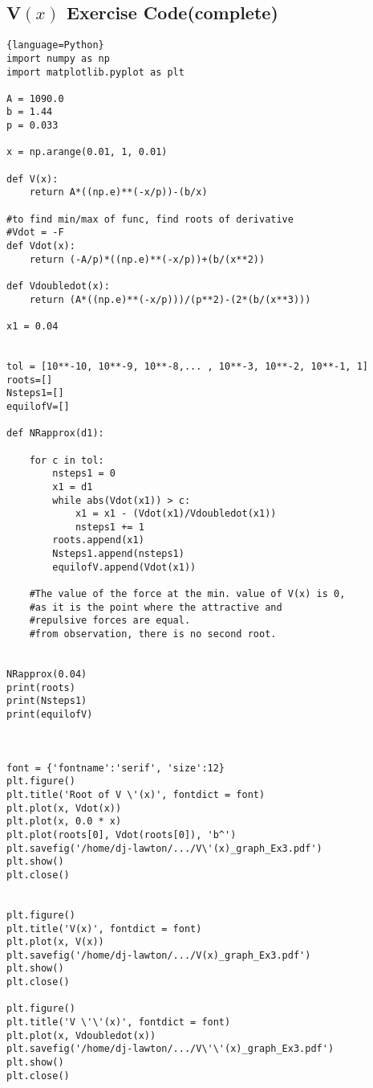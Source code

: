 \documentclass{article}
\begin{document}
\subsection{V$(x)$ Exercise Code(complete)}
\begin{lstlisting}{language=Python}
import numpy as np
import matplotlib.pyplot as plt

A = 1090.0
b = 1.44
p = 0.033

x = np.arange(0.01, 1, 0.01)

def V(x): 
    return A*((np.e)**(-x/p))-(b/x)

#to find min/max of func, find roots of derivative
#Vdot = -F
def Vdot(x): 
    return (-A/p)*((np.e)**(-x/p))+(b/(x**2))

def Vdoubledot(x): 
    return (A*((np.e)**(-x/p)))/(p**2)-(2*(b/(x**3)))

x1 = 0.04


tol = [10**-10, 10**-9, 10**-8,... , 10**-3, 10**-2, 10**-1, 1]
roots=[]
Nsteps1=[]
equilofV=[]

def NRapprox(d1):
    
    for c in tol:
        nsteps1 = 0
        x1 = d1
        while abs(Vdot(x1)) > c:
            x1 = x1 - (Vdot(x1)/Vdoubledot(x1))
            nsteps1 += 1
        roots.append(x1)
        Nsteps1.append(nsteps1)
        equilofV.append(Vdot(x1))
    
    #The value of the force at the min. value of V(x) is 0, 
    #as it is the point where the attractive and 
    #repulsive forces are equal. 
    #from observation, there is no second root.
       

NRapprox(0.04)
print(roots)
print(Nsteps1)
print(equilofV)



font = {'fontname':'serif', 'size':12}
plt.figure()
plt.title('Root of V \'(x)', fontdict = font)
plt.plot(x, Vdot(x))
plt.plot(x, 0.0 * x)
plt.plot(roots[0], Vdot(roots[0]), 'b^')
plt.savefig('/home/dj-lawton/.../V\'(x)_graph_Ex3.pdf')
plt.show()
plt.close()


plt.figure()
plt.title('V(x)', fontdict = font)
plt.plot(x, V(x))
plt.savefig('/home/dj-lawton/.../V(x)_graph_Ex3.pdf')
plt.show()
plt.close()

plt.figure()
plt.title('V \'\'(x)', fontdict = font)
plt.plot(x, Vdoubledot(x))
plt.savefig('/home/dj-lawton/.../V\'\'(x)_graph_Ex3.pdf')
plt.show()
plt.close()
\end{lstlisting}
\end{document}
